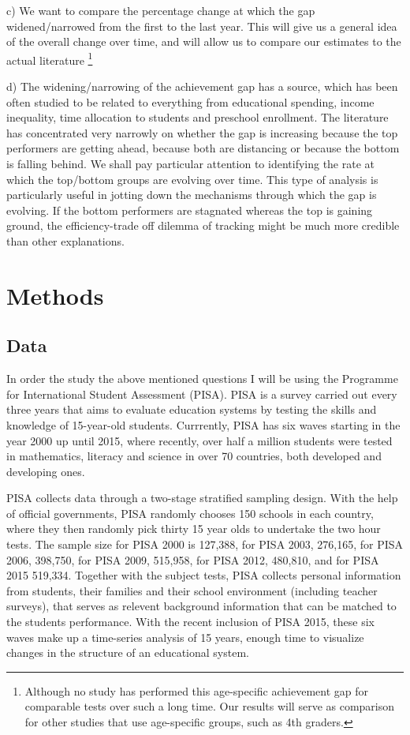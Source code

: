 \documentclass[11pt, a4paper]{article}\usepackage[]{graphicx}\usepackage[]{color}
\begin{document}
c) We want to compare the percentage change at which the gap widened/narrowed from the first to the last year. This will give us a general idea of the overall change over time, and will allow us to compare our estimates to the actual literature \footnote{Although no study has performed this age-specific achievement gap for comparable tests over such a long time. Our results will serve as comparison for other studies that use age-specific groups, such as 4th graders.}

d) The widening/narrowing of the achievement gap has a source, which has been often studied to be related to everything from educational spending, income inequality, time allocation to students and preschool enrollment. The literature has concentrated very narrowly on whether the gap is increasing because the top performers are getting ahead, because both are distancing or because the bottom is falling behind. We shall pay particular attention to identifying the rate at which the top/bottom groups are evolving over time. This type of analysis is particularly useful in jotting down the mechanisms through which the gap is evolving. If the bottom performers are stagnated whereas the top is gaining ground, the efficiency-trade off dilemma of tracking might be much more credible than other explanations.

\section{Methods}

\subsection{Data}



In order the study the above mentioned questions I will be using the Programme for International Student Assessment (PISA). PISA is a survey carried out every three years that aims to evaluate education systems by testing the skills and knowledge of 15-year-old students. Currrently, PISA has six waves starting in the year 2000 up until 2015, where recently, over half a million students were tested in mathematics, literacy and science in over 70 countries, both developed and developing ones.

PISA collects data through a two-stage stratified sampling design. With the help of official governments, PISA randomly chooses 150 schools in each country, where they then randomly pick thirty 15 year olds to undertake the two hour tests. The sample size for PISA 2000 is 127,388, for PISA 2003, 276,165, for PISA 2006, 398,750, for PISA 2009, 515,958, for PISA 2012, 480,810, and for PISA 2015 519,334. Together with the subject tests, PISA collects personal information from students, their families and their school environment (including teacher surveys), that serves as relevent background information that can be matched to the students performance. With the recent inclusion of PISA 2015, these six waves make up a time-series analysis of 15 years, enough time to visualize changes in the structure of an educational system.
\end{document}
